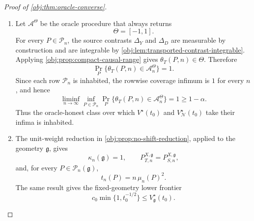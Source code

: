 \begin{proof}[Proof of \cref{obj:thm:oracle-converse}]
\begin{enumerate}
\item Let \(\mathcal A^\Theta\) be the oracle procedure that always returns
\[
  \Theta=[-1,1].
\]
For every \(P\in\mathcal P_n\), the source contrasts \(\Delta_Y\) and \(\Delta_D\) are
measurable by construction and are integrable by \cref{obj:lem:transported-contrast-integrable}.
Applying \cref{obj:prop:compact-causal-range} gives \(\theta_T(P,n)\in\Theta\). Therefore
\[
  \Pr_P\{\theta_T(P,n)\in\mathcal A^\Theta_n\}=1 .
\]
Since each row \(\mathcal P_n\) is inhabited, the rowwise coverage infimum is \(1\) for every
\(n\), and hence
\[
  \liminf_{n\to\infty}\inf_{P\in\mathcal P_n}
  \Pr_P\{\theta_T(P,n)\in\mathcal A^\Theta_n\}
  =
  1
  \ge 1-\alpha .
\]
Thus the oracle-honest class over which \(V^\star(t_0)\) and
\(V_{\mathcal N}^\star(t_0)\) take their infima is inhabited. %

\item The unit-weight reduction in \cref{obj:prop:no-shift-reduction}, applied to the
geometry \(\mathfrak g\), gives
\[
  \kappa_n(\mathfrak g)=1,
  \qquad
  P^{X,\mathfrak g}_{T,n}=P^{X,\mathfrak g}_{S,n},
\]
and, for every \(P\in\mathcal P_n(\mathfrak g)\),
\[
  t_n(P)
  =
  n\,\mu_n(P)^2 .
\]
The same result gives the fixed-geometry lower frontier
\[
  c_0\min\{1,t_0^{-1/2}\}
  \le
  V_{\mathfrak g}^\star(t_0).
\] %


\end{enumerate}
\end{proof}
